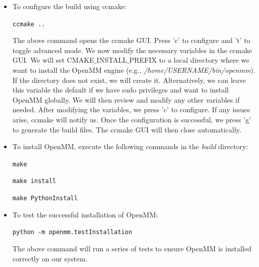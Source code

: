 \documentclass[9pt,training,pubversion]{livecoms}
\begin{document}
\begin{itemize}
\item To configure the build using ccmake:

\begin{tcolorbox}[colback=black!8!white, colframe=black!50!black, fontlower=\tiny, left=2pt, right=2pt, top=2pt, bottom=2pt] 
\texttt{ccmake ..} 
\end{tcolorbox}

\noindent The above command opens the ccmake GUI. Press 'c' to configure and 't' to toggle advanced mode. We now modify the necessary variables in the ccmake GUI. We will set CMAKE$\_$INSTALL$\_$PREFIX to a local directory where we want to install the OpenMM engine (e.g., \textit{/home/USERNAME/bin/openmm}). If the directory does not exist, we will create it. Alternatively, we can leave this variable the default if we have sudo privileges and want to install OpenMM globally. We will then review and modify any other variables if needed. After modifying the variables, we press 'c' to configure. If any issues arise, ccmake will notify us. Once the configuration is successful, we press 'g' to generate the build files. The ccmake GUI will then close automatically.

\item To install OpenMM, execute the following commands in the \textit{build} directory:

\begin{tcolorbox}[colback=black!8!white, colframe=black!50!black, fontlower=\tiny, left=2pt, right=2pt, top=2pt, bottom=2pt] 
\texttt{make} 
\end{tcolorbox}

\begin{tcolorbox}[colback=black!8!white, colframe=black!50!black, fontlower=\tiny, left=2pt, right=2pt, top=2pt, bottom=2pt] 
\texttt{make install} 
\end{tcolorbox}

\begin{tcolorbox}[colback=black!8!white, colframe=black!50!black, fontlower=\tiny, left=2pt, right=2pt, top=2pt, bottom=2pt] 
\texttt{make PythonInstall} 
\end{tcolorbox}

\item To test the successful installation of OpenMM:

\begin{tcolorbox}[colback=black!8!white, colframe=black!50!black, fontlower=\tiny, left=2pt, right=2pt, top=2pt, bottom=2pt] 
\texttt{python -m openmm.testInstallation} 
\end{tcolorbox}

\noindent The above command will run a series of tests to ensure OpenMM is installed correctly on our system. 

\end{itemize}
\end{document}
